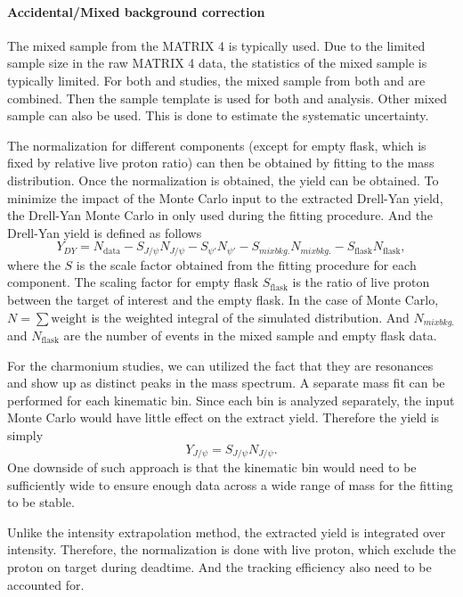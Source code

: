 \documentclass[../main.tex]{subfiles}
\begin{document}
\paragraph{Accidental/Mixed background correction}
The mixed sample from the MATRIX 4 is typically used. Due to the limited sample size in the raw
MATRIX 4 data, the statistics of the mixed sample is typically limited. For both  and 
 studies, the mixed sample from both  and  are combined. Then the sample
template is used for both  and  analysis. 
Other mixed sample can also be used. This is done to estimate the systematic uncertainty.

The normalization for different components (except for empty flask, which is fixed by relative live proton ratio)
can then be obtained by fitting to the mass distribution. Once the normalization is obtained, the yield can be 
obtained. To minimize the impact of the Monte Carlo input to the extracted Drell-Yan yield, the Drell-Yan Monte 
Carlo in only used during the fitting procedure. And the Drell-Yan yield is defined as follows
\begin{equation}
	Y_{DY}= N_{\textrm{data}}-S_{J/\psi} N_{J/\psi}-S_{\psi'} N_{\psi'}-S_{mix bkg.} N_{mix bkg.} - S_{\textrm{flask}} N_{\textrm{flask}},
\end{equation}
where the $S$ is the scale factor obtained from the fitting procedure for each component. The scaling 
factor for empty flask $S_{\textrm{flask}}$ is the ratio of live proton between the target of interest
and the empty flask. In the case of Monte Carlo, $N=\sum\textrm{weight}$  is the weighted integral of the
simulated distribution. And $N_{mix bkg.}$ and $N_{\textrm{flask}}$ are the number of events in the mixed 
sample and empty flask data.

For the charmonium studies, we can utilized the fact that they are resonances and show up as distinct peaks
in the mass spectrum. A separate mass fit can be performed for each kinematic bin. Since each bin is analyzed
separately, the input Monte Carlo would have little effect on the extract yield. Therefore the yield is simply
\begin{equation}
	Y_{J/\psi}= S_{J/\psi} N_{J/\psi}.
\end{equation}
One downside of such approach is that the kinematic bin would need to be sufficiently wide to ensure enough
data across a wide range of mass for the fitting to be stable.

Unlike the intensity extrapolation method, the extracted yield is integrated over intensity. Therefore, the
normalization is done with live proton, which exclude the proton on target during deadtime. And the tracking
efficiency also need to be accounted for.
\end{document}

